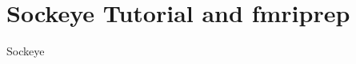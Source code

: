 \documentclass[aspectratio=169,xcolor=dvipsnames]{beamer}
\begin{document}
%
%
%
%


\section{Sockeye Tutorial and fmriprep}

\begin{frame}{Sockeye}

\end{frame}

\end{document}
